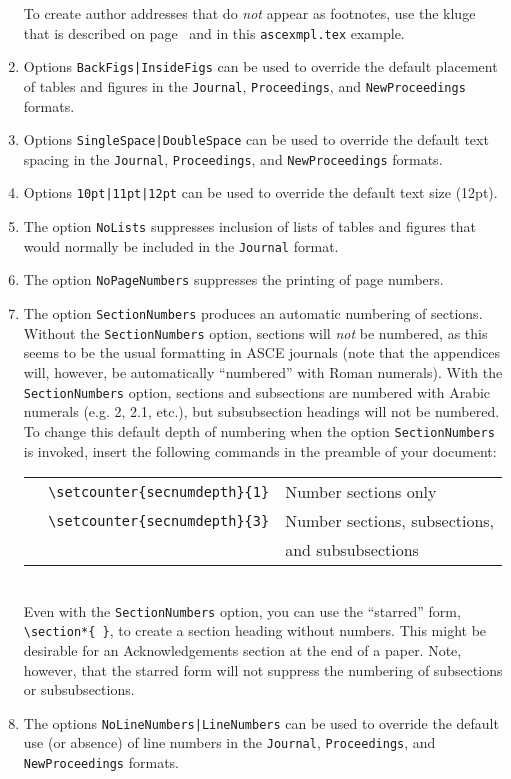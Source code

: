 \documentclass[Proceedings]{ascelike}
\begin{document}
\begin{enumerate}
To create author addresses that do \emph{not} appear as footnotes,
use the kluge that is described on page~\pageref{address.kluge}
and in this \texttt{ascexmpl.tex} example.
%
\item
Options \verb+BackFigs|InsideFigs+ can be used to override 
the default placement of tables
and figures in the \texttt{Journal}, \texttt{Proceedings}, and
\texttt{NewProceed\-ings} formats.
\item
Options \verb+SingleSpace|DoubleSpace+ can be used to override 
the default text spacing in the 
\texttt{Journal}, \texttt{Proceedings}, and
\texttt{NewProceedings} formats.
\item
Options \verb+10pt|11pt|12pt+ can be used to override the 
default text size (12pt).
\item
The option \texttt{NoLists} suppresses inclusion of lists of tables
and figures that would normally be included in the \texttt{Journal}
format.
\item
The option \texttt{NoPageNumbers} suppresses the printing of page numbers.
\item
The option \texttt{SectionNumbers} produces an automatic numbering of sections.
Without the \texttt{SectionNumbers} option, sections will \emph{not} be
numbered, as this seems to be the usual formatting in ASCE journals 
(note that the appendices will, however, be automatically
``numbered'' with Roman numerals).  
With the \texttt{SectionNumbers} option, sections and
subsections are numbered with Arabic numerals (e.g. 2, 2.1, etc.), but
subsubsection headings will not be numbered.  To change this default
depth of numbering when
the option \texttt{SectionNumbers} is invoked, insert the following commands
in the preamble of your document:\\[2mm]
\begin{tabular}{ll}
\verb!  \setcounter{secnumdepth}{1}! & Number sections only\\
\verb!  \setcounter{secnumdepth}{3}! & Number sections, subsections, \\
                                   & and subsubsections
\end{tabular}\\[2mm]
Even with the \texttt{SectionNumbers} option, you can use the ``starred''
form, \verb!\section*{ }!, to create a section heading without numbers.
This might be desirable for an Acknowledgements section at the end of
a paper.  Note, however, that the starred form will not suppress
the numbering of subsections or subsubsections.
\item
The options \verb+NoLineNumbers|LineNumbers+ can be used to override
the default use (or absence) of line numbers in the \texttt{Journal},
\texttt{Proceedings}, and
\texttt{NewProceedings} formats.
\end{enumerate}
%
\end{document}
